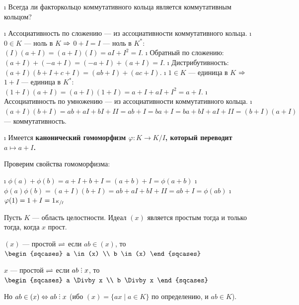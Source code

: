 \begin{problem}[19(4.2)]
\end{problem}

\begin{enumerate}
\def\labelenumi{\alph{enumi})}
\tightlist
\i
  Всегда ли факторкольцо коммутативного кольца является коммутативным кольцом?
  \begin{solution}

  \begin{itemize}
  \tightlist
  \i
    Ассоциативность по сложению --- из ассоциативности коммутативного кольца.
  \i
    \(0 \in K\) --- ноль в \(K\) \(\Rightarrow\) \(0+I=I\) --- ноль в \(K^*\): \((I)(a+I) = (a+I)(I) = aI+I^2 = I\).
  \i
    Обратный по сложению: \((a+I)+(-a+I) = (-a+I)+(a+I) = I\).
  \i
    Дистрибутивность: \((a+I)(b+I+c+I) = (ab+I)+(ac+I)\).
  \i
    \(1 \in K\) --- единица в \(K\) \(\Rightarrow\) \(1+I\) --- единица в \(K^*\): \((1+I)(a+I) = (a+I)(1+I) = a+I+aI+I^2 = a+I\).
  \i
    Ассоциативность по умножению --- из ассоциативности коммутативного кольца.
  \i
    \((a+I)(b+I) = ab+aI+bI+II=ab+I=ba+I=ba+bI+aI+II=(b+I)(a+I)\) --- коммутативность.
  \end{itemize}

  \end{solution}
\i
  Имеется \bf{канонический} гомоморфизм \(\varphi: K \to K/I\), который переводит \(a \mapsto a+I\).
  \begin{solution}
  Проверим свойства гомоморфизма:

  \begin{itemize}
  \tightlist
  \i
    \(\phi(a)+\phi(b)=a+I+b+I= (a+b)+I=\phi(a+b)\)
  \i
    \(\phi(a)\phi(b) = (a+I)(b+I) = ab+aI+bI+II = ab+I = \phi(ab)\)
  \i
    \(\varphi(1) = 1+I = 1_{\sfrac{K}{I}}\)
  \end{itemize}

  \end{solution}
\end{enumerate}

\begin{problem}[20(4.5)]
Пусть $K$ --- область целостности. Идеал $(x)$ является простым тогда и только тогда, когда $x$ прост.
\end{problem}

\begin{solution}
\((x)\) --- простой \(\rightleftharpoons\) если \(ab \in (x)\), то \(\begin{sqcases} a \in (x) \\ b \in (x) \end{sqcases}\)

\(x\) --- простой \(\rightleftharpoons\) если \(ab \Divby x\), то \(\begin{sqcases} a \Divby x \\ b \Divby x \end{sqcases}\)

Но \(ab \in (x) \Iff ab \Divby x\) (ибо \((x) = \{ax \mid a \in K\}\) по определению, и \(ab \in K\)).
\end{solution}

